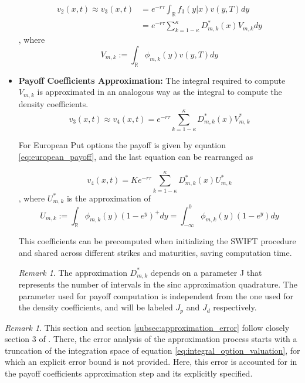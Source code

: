 \documentclass[12,twoside]{mammeTFM}
\theoremstyle{definition}
\theoremstyle{remark}
\newtheorem{remark}[thm]{Remark}
\newcommand{\R}{\ensuremath{\mathbb{R}}}
\begin{document}
\begin{itemize}
\begin{equation}
\end{equation}
\begin{equation}
\begin{aligned}
v_2(x,t) \approx v_3(x,t) & = e^{-r \tau} \int_{\R} f_3(y|x)v(y, T)dy \\
&= e^{-r \tau} \sum_{k = 1 - \kappa}^{\kappa} D_{m,k}^{*}(x)  V_{m,k}dy
\end{aligned}
\end{equation}
, where
\begin{equation}
V_{m,k} := \int_{\R} \phi_{m,k}(y) v(y, T)dy
\end{equation}
\item \textbf{Payoff Coefficients Approximation: }
The integral required to compute $V_{m,k}$ is approximated in an analogous way as the integral to compute the density coefficients.
\begin{equation}
v_3(x,t) \approx v_4(x,t) = e^{-r \tau} \sum_{k = 1 - \kappa}^{\kappa} D_{m,k}^{*}(x) V_{m,k}^{*}
\end{equation}

For European Put options the payoff is given by equation \ref{eq:european_payoff}, and the last equation can be rearranged as

\begin{equation}
v_4(x,t) = K e^{-r \tau} \sum_{k = 1 - \kappa}^{\kappa} D_{m,k}^{*}(x) U_{m,k}^{*}
\end{equation}
, where $U_{m,k}^{*}$ is the approximation of 
\begin{equation}
U_{m,k} := \int_{\R} \phi_{m,k}(y)(1-e^{y})^{+} dy = \int_{-\infty}^{0} \phi_{m,k}(y)(1-e^{y}) dy
\end{equation}

This coefficients can be precomputed when initializing the SWIFT procedure and shared across different strikes and maturities, saving computation time.
\begin{remark}
The approximation $D_{m,k}^{*}$ depends on a parameter J that represents the number of intervals in the sinc approximation quadrature. The parameter used for payoff computation is independent from the one used for the density coefficients, and will be labeled $J_p$ and $J_d$ respectively.
\end{remark}
\end{itemize}

\begin{remark}
This section and section \ref{subsec:approximation_error} follow closely section 3 of \cite{mar17}. There, the error analysis of the approximation process starts with a truncation of the integration space of equation  \ref{eq:integral_option_valuation}, for which an explicit error bound is not provided. Here, this error is accounted for in the payoff coefficients approximation step and its explicitly specified.
\end{remark}
\end{document}
